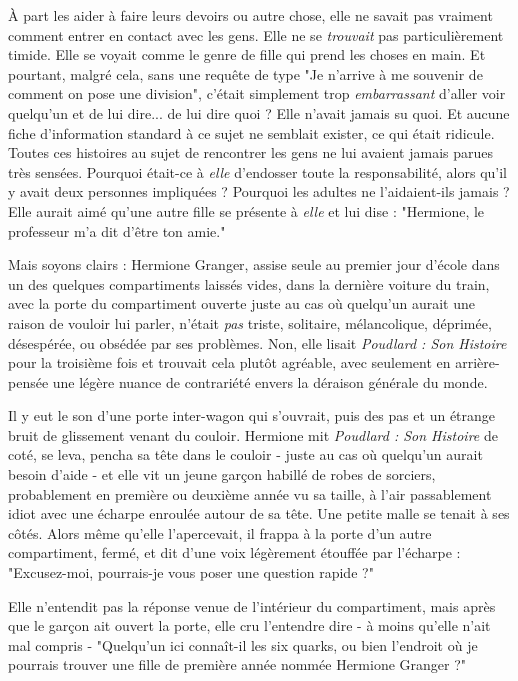 À part les aider à faire leurs devoirs ou autre chose, elle ne savait pas vraiment comment entrer en contact avec les gens. Elle ne se \emph{trouvait}  pas particulièrement timide. Elle se voyait comme le genre de fille qui prend les choses en main. Et pourtant, malgré cela, sans une requête de type "Je n'arrive à me souvenir de comment on pose une division", c'était simplement trop \emph{embarrassant } d'aller voir quelqu'un et de lui dire... de lui dire quoi ? Elle n'avait jamais su quoi. Et aucune fiche d'information standard à ce sujet ne semblait exister, ce qui était ridicule. Toutes ces histoires au sujet de rencontrer les gens ne lui avaient jamais parues très sensées. Pourquoi était-ce à \emph{elle}  d'endosser toute la responsabilité, alors qu'il y avait deux personnes impliquées ? Pourquoi les adultes ne l'aidaient-ils jamais ? Elle aurait aimé qu'une autre fille se présente à \emph{elle}  et lui dise : "Hermione, le professeur m'a dit d'être ton amie."

Mais soyons clairs : Hermione Granger, assise seule au premier jour d'école dans un des quelques compartiments laissés vides, dans la dernière voiture du train, avec la porte du compartiment ouverte juste au cas où quelqu'un aurait une raison de vouloir lui parler, n'était \emph{pas}  triste, solitaire, mélancolique, déprimée, désespérée, ou obsédée par ses problèmes. Non, elle lisait \emph{Poudlard : Son Histoire}  pour la troisième fois et trouvait cela plutôt agréable, avec seulement en arrière-pensée une légère nuance de contrariété envers la déraison générale du monde.

Il y eut le son d'une porte inter-wagon qui s'ouvrait, puis des pas et un étrange bruit de glissement venant du couloir. Hermione mit \emph{Poudlard : Son Histoire}  de coté, se leva, pencha sa tête dans le couloir - juste au cas où quelqu'un aurait besoin d'aide - et elle vit un jeune garçon habillé de robes de sorciers, probablement en première ou deuxième année vu sa taille, à l'air passablement idiot avec une écharpe enroulée autour de sa tête. Une petite malle se tenait à ses côtés. Alors même qu'elle l'apercevait, il frappa à la porte d'un autre compartiment, fermé, et dit d'une voix légèrement étouffée par l'écharpe : "Excusez-moi, pourrais-je vous poser une question rapide ?"

Elle n'entendit pas la réponse venue de l'intérieur du compartiment, mais après que le garçon ait ouvert la porte, elle cru l'entendre dire - à moins qu'elle n'ait mal compris - "Quelqu'un ici connaît-il les six quarks, ou bien l'endroit où je pourrais trouver une fille de première année nommée Hermione Granger ?"

